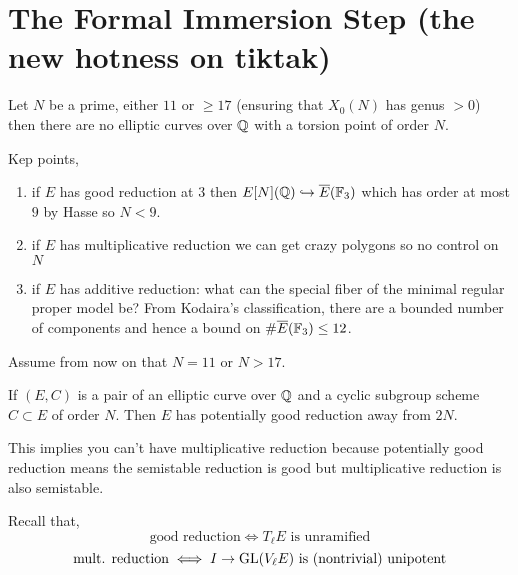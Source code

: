 \documentclass[12pt]{article}
\begin{document}
\section{The Formal Immersion Step (the new hotness on tiktak)}

\newcommand{\hatO}{\wh{\mathcal{O}}}
\newcommand{\TT}{\mathbb{T}}
\newcommand{\FFbar}{\overline{\mathbb{F}}}

\begin{theorem}
Let $N$ be a prime, either $11$ or $\ge 17$ (ensuring that $X_0(N)$ has genus $> 0$) then there are no elliptic curves over $\mathbb{Q}$ with a torsion point of order $N$. 
\end{theorem}

Kep points, 

\begin{enumerate}
\item if $E$ has good reduction at $3$ then $E[N](\mathbb{Q}) \hookrightarrow \overline{E}(\mathbb{F}_3)$ which has order at most $9$ by Hasse so $N < 9$.

\item if $E$ has multiplicative reduction we can get crazy polygons so no control on $N$

\item if $E$ has additive reduction: what can the special fiber of the minimal regular proper model be? From Kodaira's classification, there are a bounded number of components and hence a bound on $\# \overline{E}(\mathbb{F}_3) \le 12$.  
\end{enumerate}
 
Assume from now on that $N = 11$ or $N > 17$. 
 
\begin{prop}
If $(E, C)$ is a pair of an elliptic curve over $\mathbb{Q}$ and a cyclic subgroup scheme $C \subset E$ of order $N$. Then $E$ has potentially good reduction away from $2N$.
\end{prop}

\begin{rmk}
This implies you can't have multiplicative reduction because potentially good reduction means the semistable reduction is good but multiplicative reduction is also semistable.
\end{rmk}

\begin{rmk}
Recall that,
\[ \text{good reduction} \iff T_\ell E \text{ is unramified} \]
\[ \text{mult. reduction} \iff I \to \mathrm{GL}(V_\ell E) \text{ is (nontrivial) unipotent} \]
\end{rmk}
\end{document}
